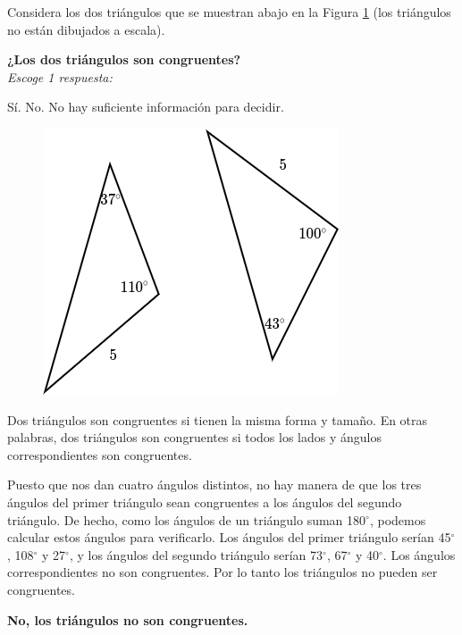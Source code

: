 Considera los dos triángulos que se muestran abajo en la Figura \ref{fig:20230323154518} (los triángulos no están dibujados a escala).

\begin{minipage}{0.6\textwidth}
    \textbf{¿Los dos triángulos son congruentes?}\\
    \emph{Escoge 1 respuesta:}\\

    \begin{choices}
        \choice Sí.
        \CorrectChoice No.
        \choice No hay suficiente información para decidir.
    \end{choices}
\end{minipage}%
\begin{minipage}{0.35\textwidth}
    \begin{figure}[H]
        \includegraphics[width=\linewidth]{../images/20230323154518}
        \caption{}
        \label{fig:20230323154518}
    \end{figure}
\end{minipage}

\begin{solutionbox}{3cm}\footnotesize
    Dos triángulos son congruentes si tienen la misma forma y tamaño. En otras palabras, dos triángulos son congruentes si todos los lados y ángulos correspondientes son congruentes.

    Puesto que nos dan cuatro ángulos distintos, no hay manera de que los tres ángulos del primer triángulo sean congruentes a los ángulos del segundo triángulo.
    De hecho, como los ángulos de un triángulo suman 180$^\circ$, podemos calcular estos ángulos para verificarlo. Los ángulos del primer triángulo serían 45$^\circ$, 108$^\circ$ y 27$^\circ$, y los ángulos del segundo triángulo serían 73$^\circ$, 67$^\circ$ y 40$^\circ$.
    Los ángulos correspondientes no son congruentes. Por lo tanto los triángulos no pueden ser congruentes.

    \textbf{No, los triángulos no son congruentes.}
\end{solutionbox}